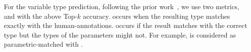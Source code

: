 For the variable type prediction, following the prior
work~\cite{HiTyper-icse22}, we use two metrics, 
and
 with the above Top-$k$ accuracy. 
occurs when the resulting type matches exactly with the
human-annotations.  occurs if the result
matches with the correct type but the types of the parameters might
not. For example,  is considered as
parametric-matched with .


